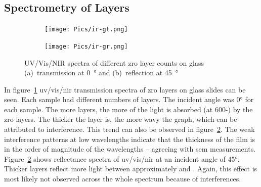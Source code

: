 \subsection{Spectrometry of  Layers}
\begin{figure}[htb]
    \centering
    \begin{subfigure}{.49\textwidth}
        \centering
        \texttt{[image: Pics/ir-gt.png]}
		\caption{}%
		\label{fig:ir-gt}
    \end{subfigure}
    \begin{subfigure}{.49\textwidth}
        \centering
        \texttt{[image: Pics/ir-gr.png]}
		\caption{}%
		\label{fig:ir-gr}
    \end{subfigure}
	\label{fig:ir}
	\caption{UV/Vis/NIR spectra of different \gls{zro} layer counts on glass 
	(a)~transmission at \SI{0}{\degree} and (b)~reflection at \SI{45}{\degree} 
	} 
\end{figure}

In figure~\ref{fig:ir-gt} \gls{uv}/\gls{vis}/\gls{nir} transmission spectra of \gls{zro} layers on glass slides can be seen. 
Each sample had different numbers of layers. 
The incident angle was \ang{0} for each sample.
The more layers, the more of the light is absorbed (at 600-) by the \gls{zro} layers. 
The thicker the layer is, the more wavy the graph, which can be attributed to interference\cite{Dumin1967}.
This trend can also be observed in figure~\ref{fig:ir-gr}.
The weak interference patterns at low wavelengths indicate that the thickness of the film is in the order of magnitude of the wavelengths\cite{delimafilho2017film} -- agreeing with \gls{sem} measurements. 
%
Figure~\ref{fig:ir-gr} shows reflectance spectra of \gls{uv}/\gls{vis}/\gls{nir} at an incident angle of \ang{45}. 
Thicker layers reflect more light between approximately  and . 
Again, this effect is most likely not observed across the whole spectrum because of interferences. 


